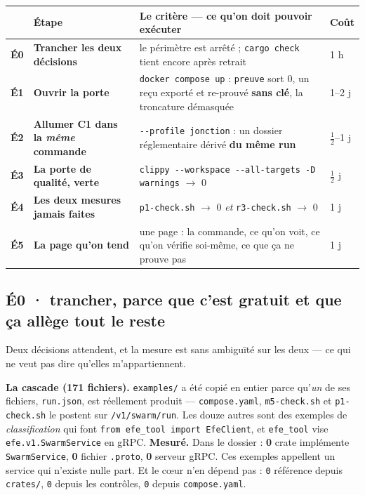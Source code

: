 \documentclass[11pt]{article}
\newcommand{\code}[1]{\texttt{\small #1}}
\newcommand{\best}[1]{{\color{efesolve}\textbf{#1}}}
\newcommand{\mm}[1]{\textbf{#1}}
\newcommand{\sz}[1]{{\small #1}}
\newcommand{\mesure}[1]{{\color{efeteal}\textbf{Mesuré.} }#1\par}
\newcommand{\fl}{$\rightarrow$}
\begin{document}
\begin{center}\small
\renewcommand{\arraystretch}{1.3}
\begin{tabular}{@{}>{\raggedright\arraybackslash}p{0.8cm} >{\raggedright\arraybackslash}p{4.3cm} >{\raggedright\arraybackslash}p{8.4cm} >{\raggedright\arraybackslash}p{2.0cm}@{}}
\toprule
& \textbf{Étape} & \textbf{Le critère --- ce qu'on doit pouvoir exécuter} & \textbf{Coût} \\
\midrule
\mm{É0} & \textbf{Trancher les deux décisions} & le périmètre est arrêté ; \code{cargo check} tient encore après retrait & \sz{1 h} \\
\mm{É1} & \textbf{Ouvrir la porte} & \code{docker compose up} : \code{preuve} sort 0, un reçu exporté et re-prouvé \textbf{sans clé}, la troncature démasquée & \sz{1--2 j} \\
\mm{É2} & \textbf{Allumer C1 dans la \emph{même} commande} & \code{-{}-profile jonction} : un dossier réglementaire dérivé \textbf{du même run} & \sz{$\frac{1}{2}$--1 j} \\
\mm{É3} & \textbf{La porte de qualité, verte} & \code{clippy -{}-workspace -{}-all-targets -D warnings} \fl{} 0 & \sz{$\frac{1}{2}$ j} \\
\mm{É4} & \textbf{Les deux mesures jamais faites} & \code{p1-check.sh} \fl{} 0 \emph{et} \code{r3-check.sh} \fl{} 0 & \sz{1 j} \\
\mm{É5} & \textbf{La page qu'on tend} & une page : la commande, ce qu'on voit, ce qu'on vérifie soi-même, ce que ça ne prouve pas & \sz{1 j} \\
\bottomrule
\end{tabular}
\end{center}

\subsection{\mm{É0} · trancher, parce que c'est gratuit et que ça allège tout le reste}
Deux décisions attendent, et la mesure est sans ambiguïté sur les deux --- ce qui ne veut pas dire
qu'elles m'appartiennent.

\textbf{La cascade (171 fichiers).} \code{examples/} a été copié en entier parce qu'\emph{un} de
ses fichiers, \code{run.json}, est réellement produit --- \code{compose.yaml}, \code{m5-check.sh}
et \code{p1-check.sh} le postent sur \code{/v1/swarm/run}. Les douze autres sont des exemples de
\emph{classification} qui font \code{from efe\_tool import EfeClient}, et \code{efe\_tool} vise
\code{efe.v1.SwarmService} en gRPC.
\mesure{Dans le dossier : \best{0} crate implémente \code{SwarmService}, \best{0} fichier
\code{.proto}, \best{0} serveur gRPC. Ces exemples appellent un service qui n'existe nulle part.
Et le cœur n'en dépend pas : \code{0} référence depuis \code{crates/}, \code{0} depuis les
contrôles, \code{0} depuis \code{compose.yaml}.}
\end{document}
